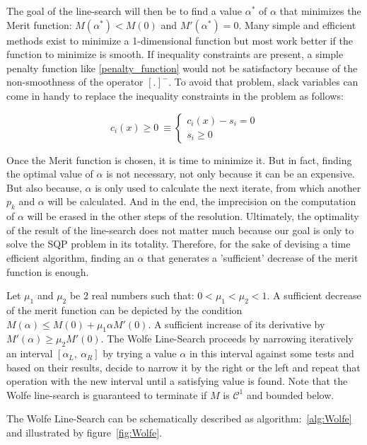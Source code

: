 The goal of the line-search will then be to find a value $\alpha^*$ of $\alpha$ that minimizes the Merit function: $M(\alpha^*) < M(0)$ and $M'(\alpha^*)=0$.
Many simple and efficient methods exist to minimize a 1-dimensional function but most work better if the function to minimize is smooth.
If inequality constraints are present, a simple penalty function like \ref{penalty_function} would not be satisfactory because of the non-smoothness of the operator $[.]^-$.
To avoid that problem, slack variables can come in handy to replace the inequality constraints in the problem as follows:

\begin{equation}
  c_i(x)\geq 0\ \equiv
  \left\{
  \begin{array}{l}
    c_i(x)-s_i=0\\
    s_i\geq 0
  \end{array}
  \right.
\end{equation}

Once the Merit function is chosen, it is time to minimize it.
But in fact, finding the optimal value of $\alpha$ is not necessary, not only because it can be an expensive.
But also because, $\alpha$ is only used to calculate the next iterate, from which another $p_k$ and $\alpha$ will be calculated.
And in the end, the imprecision on the computation of $\alpha$ will be erased in the other steps of the resolution.
Ultimately, the optimality of the result of the line-search does not matter much because our goal is only to solve the SQP problem in its totality.
Therefore, for the sake of devising a time efficient algorithm, finding an $\alpha$ that generates a 'sufficient' decrease of the merit function is enough.

Let $\mu_1$ and $\mu_2$ be 2 real numbers such that: $0<\mu_1<\mu_2<1$.
A sufficient decrease of the merit function can be depicted by the condition $M(\alpha) \leq M(0) + \mu_1 \alpha M'(0)$.
A sufficient increase of its derivative by $M'(\alpha)\geq\mu_2 M'(0)$.
The Wolfe Line-Search proceeds by narrowing iteratively an interval $[\alpha_L,\ \alpha_R]$ by trying a value $\alpha$ in this interval against some tests and based on their results, decide to narrow it by the right or the left and repeat that operation with the new interval until a satisfying value is found.
Note that the Wolfe line-search is guaranteed to terminate if $M$ is $\mathcal{C}^1$ and bounded below.

The Wolfe Line-Search can be schematically described as algorithm:~\ref{alg:Wolfe} and illustrated by figure~\ref{fig:Wolfe}.

